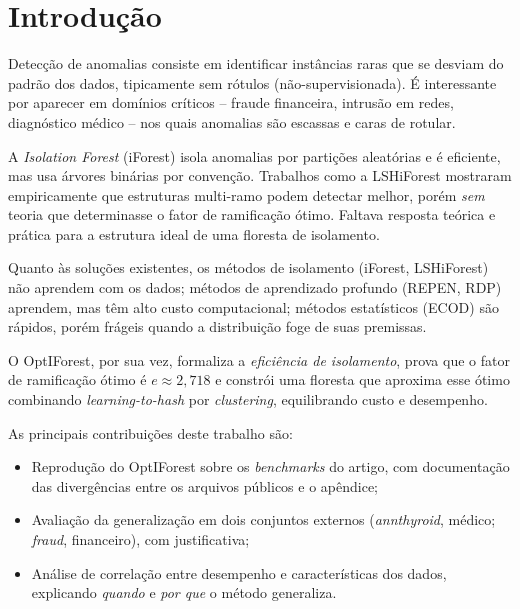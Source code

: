 \documentclass[conference]{IEEEtran}
\begin{document}
\IEEEpeerreviewmaketitle

\section{Introdu\c{c}\~ao}

Detec\c{c}\~ao de anomalias consiste em identificar inst\^ancias
raras que se desviam do padr\~ao dos dados, tipicamente sem r\'otulos
(n\~ao-supervisionada). \'E interessante por aparecer em dom\'inios cr\'iticos --
fraude financeira, intrus\~ao em redes, diagn\'ostico m\'edico -- nos quais
anomalias s\~ao escassas e caras de rotular.

A \emph{Isolation Forest} (iForest)
isola anomalias por parti\c{c}\~oes aleat\'orias e \'e eficiente, mas usa \'arvores
bin\'arias por conven\c{c}\~ao. Trabalhos como a LSHiForest mostraram empiricamente
que estruturas multi-ramo podem detectar melhor, por\'em \emph{sem} teoria que
determinasse o fator de ramifica\c{c}\~ao \'otimo. Faltava resposta te\'orica e
pr\'atica para a estrutura ideal de uma floresta de isolamento.

Quanto \`as solu\c{c}\~oes existentes, os m\'etodos de isolamento
(iForest, LSHiForest) n\~ao aprendem com os dados; m\'etodos de aprendizado
profundo (REPEN, RDP) aprendem, mas t\^em alto custo computacional; m\'etodos
estat\'isticos (ECOD) s\~ao r\'apidos, por\'em fr\'ageis quando a distribui\c{c}\~ao
foge de suas premissas.

O OptIForest, por sua vez, formaliza a \emph{efici\^encia de
isolamento}, prova que o fator de ramifica\c{c}\~ao \'otimo \'e $e \approx 2{,}718$ e
constr\'oi uma floresta que aproxima esse \'otimo combinando \emph{learning-to-hash}
por \emph{clustering}, equilibrando custo e desempenho.

As principais contribui\c{c}\~oes deste trabalho s\~ao:
\begin{itemize}
  \item Reprodu\c{c}\~ao do OptIForest sobre os \emph{benchmarks} do artigo, com
        documenta\c{c}\~ao das diverg\^encias entre os arquivos p\'ublicos e o ap\^endice;
  \item Avalia\c{c}\~ao da generaliza\c{c}\~ao em dois conjuntos externos
        (\emph{annthyroid}, m\'edico; \emph{fraud}, financeiro), com justificativa;
  \item An\'alise de correla\c{c}\~ao entre desempenho e caracter\'isticas dos dados,
        explicando \emph{quando} e \emph{por que} o m\'etodo generaliza.
\end{itemize}
\end{document}
